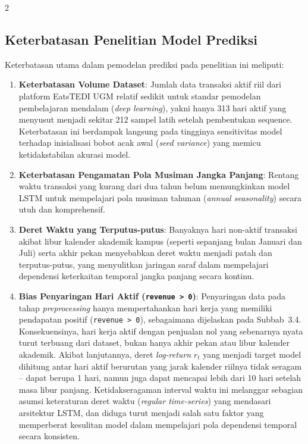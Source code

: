 \documentclass[12pt, a4paper, onecolumn, oneside]{report}
\begin{document}
\begin{spacing}{2}
\subsection{Keterbatasan Penelitian Model Prediksi}

Keterbatasan utama dalam pemodelan prediksi pada penelitian ini meliputi:
\begin{enumerate}
    \item \textbf{Keterbatasan Volume Dataset}: Jumlah data transaksi aktif riil dari platform EatsTEDI UGM relatif sedikit untuk standar pemodelan pembelajaran mendalam (\textit{deep learning}), yakni hanya 313 hari aktif yang menyusut menjadi sekitar 212 sampel latih setelah pembentukan sequence. Keterbatasan ini berdampak langsung pada tingginya sensitivitas model terhadap inisialisasi bobot acak awal (\textit{seed variance}) yang memicu ketidakstabilan akurasi model.
    
    \item \textbf{Keterbatasan Pengamatan Pola Musiman Jangka Panjang}: Rentang waktu transaksi yang kurang dari dua tahun belum memungkinkan model LSTM untuk mempelajari pola musiman tahunan (\textit{annual seasonality}) secara utuh dan komprehensif.
    
    \item \textbf{Deret Waktu yang Terputus-putus}: Banyaknya hari non-aktif transaksi akibat libur kalender akademik kampus (seperti sepanjang bulan Januari dan Juli) serta akhir pekan menyebabkan deret waktu menjadi patah dan terputus-putus, yang menyulitkan jaringan saraf dalam mempelajari dependensi keterkaitan temporal jangka panjang secara kontinu.

    \item \textbf{Bias Penyaringan Hari Aktif (\texttt{revenue > 0})}: Penyaringan data pada tahap \textit{preprocessing} hanya mempertahankan hari kerja yang memiliki pendapatan positif (\texttt{revenue > 0}), sebagaimana dijelaskan pada Subbab~3.4. Konsekuensinya, hari kerja aktif dengan penjualan nol yang sebenarnya nyata turut terbuang dari dataset, bukan hanya akhir pekan atau libur kalender akademik. Akibat lanjutannya, deret \textit{log-return} $r_t$ yang menjadi target model dihitung antar hari aktif berurutan yang jarak kalender riilnya tidak seragam -- dapat berupa 1 hari, namun juga dapat mencapai lebih dari 10 hari setelah masa libur panjang. Ketidakseragaman interval waktu ini melanggar sebagian asumsi keteraturan deret waktu (\textit{regular time-series}) yang mendasari arsitektur LSTM, dan diduga turut menjadi salah satu faktor yang memperberat kesulitan model dalam mempelajari pola dependensi temporal secara konsisten.
\end{enumerate}


\end{spacing}
\end{document}
